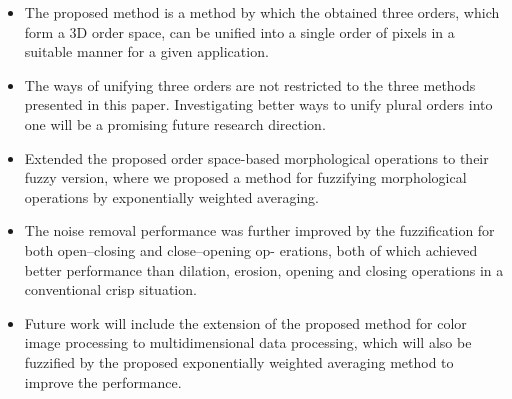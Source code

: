 \begin{itemize}
    \item The proposed method is a method by which the obtained three orders, which form a 3D order space, can be unified into a single order of pixels in a suitable manner for a given application.
    \item The ways of unifying three orders are not restricted to the three methods presented in this paper. Investigating better ways to unify plural orders into one will be a promising future research direction.
    \item Extended the proposed order space-based morphological operations to their fuzzy version, where we proposed a method for fuzzifying morphological operations by exponentially weighted averaging.
    \item The noise removal performance was further improved by the fuzzification for both open–closing and close–opening op- erations, both of which achieved better performance than dilation, erosion, opening and closing operations in a conventional crisp situation.
    \item Future work will include the extension of the proposed method for color image processing to multidimensional data processing, which will also be fuzzified by the proposed exponentially weighted averaging method to improve the performance.
\end{itemize}

